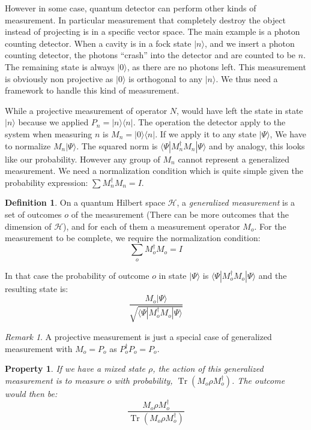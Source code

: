 \documentclass[10pt]{report}
\theoremstyle{plain}
\newtheorem{prop}[thm]{Property}
\theoremstyle{definition}
\newtheorem{defn}{Definition}[chapter]
\theoremstyle{remark}
\newtheorem*{rem}{Remark}
\newcommand{\ket}[1]{|#1\rangle}
\newcommand{\bra}[1]{\langle#1|}
\DeclareMathOperator{\Tr}{Tr}
\begin{document}
However in some case, quantum detector can perform other kinds of measurement.
In particular measurement that completely destroy the object instead of
projecting is in a specific vector space. The main example is a photon counting
detector. When a cavity is in a fock state $\ket n$, and we insert a photon
counting detector, the photons ``crash'' into the detector and are counted to be
$n$. The remaining state is always $\ket 0$, as there are no photons left. This
measurement is obviously non projective as $\ket 0$ is orthogonal to any $\ket
n$. We thus need a framework to handle this kind of measurement.

While a projective measurement of operator $N$, would have left the state in
state $\ket n$ because we applied $P_n = \ket n \bra n$.
The operation the detector apply to the system when measuring $n$ is $M_n = \ket
0 \bra n$. If we apply it to any state $\ket \Psi$, We have to normalize $M_n
\ket \Psi$. The squared norm is $\bra \Psi M_n^\dagger M_n \ket \Psi$ and by
analogy, this looks like our probability. However any group of $M_n$ cannot
represent a generalized measurement. We need a normalization condition which is
quite simple given the probability expression: $\sum M_n^\dagger M_n = I$.

\begin{defn}
  On a quantum Hilbert space $\mathcal{H}$, a \emph{generalized measurement} is a set
  of outcomes $o$ of the measurement (There can be more outcomes that the
  dimension of $\mathcal{H}$), and for each of them a measurement
  operator $M_o$. For the measurement to be complete, we require the
  normalization condition:
  \[\sum_o M_o^\dagger M_o = I\]

  In that case the probability of outcome $o$ in state $\ket \Psi$ is $\bra \Psi
  M_o^\dagger M_o \ket \Psi$ and the resulting state is:
\[\frac{M_o \ket \Psi}{\sqrt{\bra \Psi M_o^\dagger M_o \ket \Psi}}\]
\end{defn}

\begin{rem}
  A projective measurement is just a special case of generalized measurement
  with $M_o=P_o$ as $P_o^\dagger P_o = P_o$.
\end{rem}

\begin{prop}
  If we have a mixed state $\rho$, the action of this generalized measurement is
  to measure $o$ with probability, $\Tr(M_o\rho M_o^\dagger)$. The outcome would
  then be:
  \[\frac{M_o\rho M_o^\dagger}{\Tr(M_o\rho M_o^\dagger)}\]
\end{prop}
\end{document}

